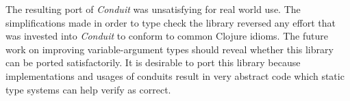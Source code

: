 The resulting port of \emph{Conduit} was unsatisfying for real world use.
The simplifications made in order to type check the library reversed
any effort that was invested into \emph{Conduit} to conform to common Clojure idioms.
The future work on improving variable-argument types should reveal whether
this library can be ported satisfactorily. It is desirable to port
this library because implementations and usages of conduits result in very abstract code
which static type systems can help verify as correct.
